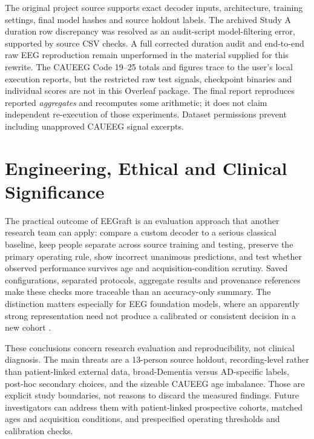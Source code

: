 The original project source supports exact decoder inputs, architecture, training settings, final model hashes and source holdout labels. The archived Study A duration row discrepancy was resolved as an audit-script model-filtering error, supported by source CSV checks. A full corrected duration audit and end-to-end raw EEG reproduction remain unperformed in the material supplied for this rewrite. The CAUEEG Code 19--25 totals and figures trace to the user's local execution reports, but the restricted raw test signals, checkpoint binaries and individual scores are not in this Overleaf package. The final report reproduces reported \emph{aggregates} and recomputes some arithmetic; it does not claim independent re-execution of those experiments. Dataset permissions prevent including unapproved CAUEEG signal excerpts.

\section{Engineering, Ethical and Clinical Significance}
The practical outcome of EEGraft is an evaluation approach that another research team can apply: compare a custom decoder to a serious classical baseline, keep people separate across source training and testing, preserve the primary operating rule, show incorrect unanimous predictions, and test whether observed performance survives age and acquisition-condition scrutiny. Saved configurations, separated protocols, aggregate results and provenance references make these checks more traceable than an accuracy-only summary. The distinction matters especially for EEG foundation models, where an apparently strong representation need not produce a calibrated or consistent decision in a new cohort \cite{xiong2026,liu2026compass}.

These conclusions concern research evaluation and reproducibility, not clinical diagnosis. The main threats are a 13-person source holdout, recording-level rather than patient-linked external data, broad-Dementia versus AD-specific labels, post-hoc secondary choices, and the sizeable CAUEEG age imbalance. Those are explicit study boundaries, not reasons to discard the measured findings. Future investigators can address them with patient-linked prospective cohorts, matched ages and acquisition conditions, and prespecified operating thresholds and calibration checks.